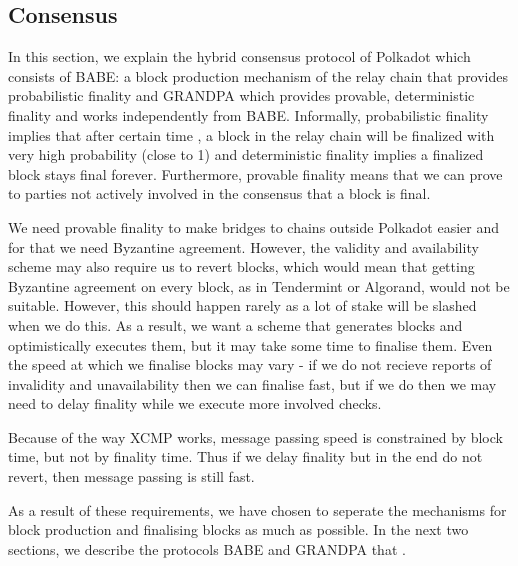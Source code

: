 \subsection{Consensus}\label{sec:consensus}

In this section, we explain the hybrid consensus protocol of Polkadot which consists of BABE: a block production mechanism of the relay chain that provides probabilistic finality and GRANDPA which provides provable, deterministic finality and works independently from BABE.  Informally, probabilistic finality implies that after certain time , a block in the relay chain will be finalized with very high probability (close to 1) and deterministic finality implies a finalized block stays final forever. Furthermore, provable finality means that  we can prove to parties not actively involved in the consensus that a block is final.

We need provable finality to make bridges to chains outside Polkadot easier and for that we need Byzantine agreement. However, the validity and availability scheme may also require us to revert blocks, which would mean that getting Byzantine agreement on every block, as in Tendermint or Algorand, would not be suitable. However, this should happen rarely as a lot of stake will be slashed when we do this. As a result, we want a scheme that generates blocks and optimistically executes them, but it may take some time to finalise them. 
Even the speed at which we finalise blocks may vary - if we do not recieve reports of invalidity and unavailability then we can finalise fast, but if we do then we may need to delay finality while we execute more involved checks.

Because of the way XCMP works, message passing speed is constrained by block time, but not by finality time. Thus if we delay finality but in the end do not revert, then message passing is still fast.

As a result of these requirements, we have chosen to seperate the mechanisms for block production and finalising blocks as much as possible. In the next two sections, we describe the protocols BABE and GRANDPA that .





